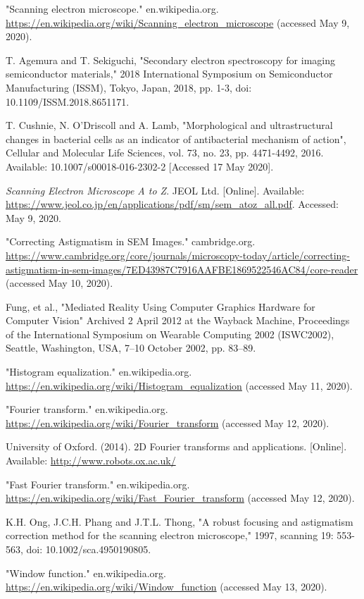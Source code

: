\documentclass[conference]{IEEEtran}
\begin{document}
\begin{thebibliography}{00}
    "Scanning electron microscope." en.wikipedia.org. \url{https://en.wikipedia.org/wiki/Scanning_electron_microscope} (accessed May 9, 2020).

    T. Agemura and T. Sekiguchi, "Secondary electron spectroscopy for imaging semiconductor materials," 2018 International Symposium on Semiconductor Manufacturing (ISSM), Tokyo, Japan, 2018, pp. 1-3, doi: 10.1109/ISSM.2018.8651171.

    T. Cushnie, N. O’Driscoll and A. Lamb, "Morphological and ultrastructural changes in bacterial cells as an indicator of antibacterial mechanism of action", Cellular and Molecular Life Sciences, vol. 73, no. 23, pp. 4471-4492, 2016. Available: 10.1007/s00018-016-2302-2 [Accessed 17 May 2020].

    \textit{Scanning Electron Microscope A to Z}. JEOL Ltd. [Online]. Available: \url{https://www.jeol.co.jp/en/applications/pdf/sm/sem_atoz_all.pdf}. Accessed: May 9, 2020.

    "Correcting Astigmatism in SEM Images." cambridge.org. \url{https://www.cambridge.org/core/journals/microscopy-today/article/correcting-astigmatism-in-sem-images/7ED43987C7916AAFBE1869522546AC84/core-reader} (accessed May 10, 2020).

    Fung, et al., "Mediated Reality Using Computer Graphics Hardware for Computer Vision" Archived 2 April 2012 at the Wayback Machine, Proceedings of the International Symposium on Wearable Computing 2002 (ISWC2002), Seattle, Washington, USA, 7–10 October 2002, pp. 83–89.

    "Histogram equalization." en.wikipedia.org. \url{https://en.wikipedia.org/wiki/Histogram_equalization} (accessed May 11, 2020).

    "Fourier transform." en.wikipedia.org. \url{https://en.wikipedia.org/wiki/Fourier_transform} (accessed May 12, 2020).

    University of Oxford. (2014). 2D Fourier transforms and applications. [Online]. Available: \url{http://www.robots.ox.ac.uk/}

    "Fast Fourier transform." en.wikipedia.org. \url{https://en.wikipedia.org/wiki/Fast_Fourier_transform} (accessed May 12, 2020).
    
    K.H. Ong, J.C.H. Phang and J.T.L. Thong, "A robust focusing and astigmatism correction method for the scanning electron microscope," 1997, scanning 19: 553-563, doi: 10.1002/sca.4950190805.

    "Window function." en.wikipedia.org. \url{https://en.wikipedia.org/wiki/Window_function} (accessed May 13, 2020).
\end{thebibliography}
\end{document}
